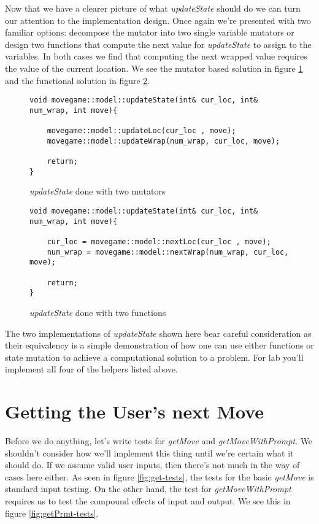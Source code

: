 \documentclass[nobib]{tufte-handout}
\begin{document}
Now that we have a clearer picture of what \textit{updateState} should do we can turn our attention to the implementation design. Once again we're presented with two familiar options: decompose the mutator into two single variable mutators or design two functions that compute the next value for \textit{updateState} to assign to the variables. In both cases we find that computing the next wrapped value requires the value of the current location. We see the mutator based solution in figure \ref{fig:update-mutate} and the functional solution in figure \ref{fig:update-func}.

\begin{figure}[!htbp]
\begin{lstlisting}
void movegame::model::updateState(int& cur_loc, int& num_wrap, int move){
	
	movegame::model::updateLoc(cur_loc , move);
	movegame::model::updateWrap(num_wrap, cur_loc, move);	
	
	return;
}
\end{lstlisting}
\caption{\textit{updateState} done with two mutators}
\label{fig:update-mutate}
\end{figure}


\begin{figure}[!htbp]
\begin{lstlisting}
void movegame::model::updateState(int& cur_loc, int& num_wrap, int move){
	
	cur_loc = movegame::model::nextLoc(cur_loc , move);
	num_wrap = movegame::model::nextWrap(num_wrap, cur_loc, move);	
	
	return;
}
\end{lstlisting}
\caption{\textit{updateState} done with two functions}
\label{fig:update-func}
\end{figure}

The two implementations of \textit{updateState} shown here bear careful consideration as their equivalency is a simple demonstration of how one can use either functions or state mutation to achieve a computational solution to a problem. For lab you'll implement all four of the helpers listed above. 
 
\section{Getting the User's next Move}

Before we do anything, let's write tests for \textit{getMove} and \textit{getMoveWithPrompt}. We shouldn't consider how we'll implement this thing until we're certain what it should do. If we assume valid user inputs, then there's not much in the way of cases here either. As seen in figure \ref{fig:get-tests}, the tests for the basic \textit{getMove} is standard input testing.  On the other hand, the test for \textit{getMoveWithPrompt} requires us to test the compound effects of input and output. We see this in figure \ref{fig:getPrmt-tests}.
\end{document}
